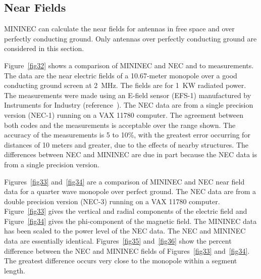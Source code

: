 \documentclass[12pt]{article}
\begin{document}
\subsection{Near Fields}
MININEC can calculate the near fields for antennas in free space and
over perfectly conducting ground. Only antennas over perfectly
conducting ground are considered in this section.

Figure~\ref{fig32} shows a comparison of MININEC and NEC and to
measurements. The data are the near electric fields of a 10.67-meter
monopole over a good conducting ground screen at 2~MHz. The fields are
for 1~KW radiated power. The measurements were made using an E-field
sensor (EFS-1) manufactured by Instruments for Industry
(reference~\cite{r21}). The NEC data are from a single precision version
(NEC-1) running on a VAX 11780 computer. The agreement between both
codes and the measurements is acceptable over the range shown. The
accuracy of the measurements is 5 to 10\%, with the greatest error
occurring for distances of 10 meters and greater, due to the effects of
nearby structures. The differences between NEC and MININEC are due in
part because the NEC data is from a single precision version.

Figures~\ref{fig33} and~\ref{fig34} are a comparison of MININEC and NEC
near field data for a quarter wave monopole over perfect ground. The NEC
data are from a double precision version (NEC-3) running on a VAX 11780
computer. Figure~\ref{fig33} gives the vertical and radial components of
the electric field and Figure~\ref{fig34} gives the phi-component of the
magnetic field. The MININEC data has been scaled to the power level of
the NEC data. The NEC and MININEC data are essentially identical.
Figures~\ref{fig35} and~\ref{fig36} show the percent difference between
the NEC and MININEC fields of Figures~\ref{fig33} and~\ref{fig34}. The
greatest difference occurs very close to the monopole within a segment
length.
\end{document}

